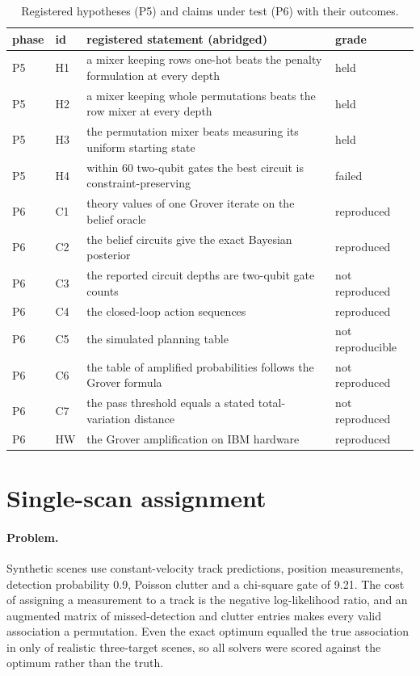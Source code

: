 \documentclass[11pt,a4paper]{article}
\begin{document}
\begin{table}[h]
\centering\small
\begin{tabular}{llp{7cm}l}
\toprule
phase & id & registered statement (abridged) & grade \\
\midrule
P5 & H1 & a mixer keeping rows one-hot beats the penalty formulation at every depth & held \\
P5 & H2 & a mixer keeping whole permutations beats the row mixer at every depth & held \\
P5 & H3 & the permutation mixer beats measuring its uniform starting state & held \\
P5 & H4 & within 60 two-qubit gates the best circuit is constraint-preserving & failed \\
\midrule
P6 & C1 & theory values of one Grover iterate on the belief oracle & reproduced \\
P6 & C2 & the belief circuits give the exact Bayesian posterior & reproduced \\
P6 & C3 & the reported circuit depths are two-qubit gate counts & not reproduced \\
P6 & C4 & the closed-loop action sequences & reproduced \\
P6 & C5 & the simulated planning table & not reproducible \\
P6 & C6 & the table of amplified probabilities follows the Grover formula & not reproduced \\
P6 & C7 & the pass threshold equals a stated total-variation distance & not reproduced \\
P6 & HW & the Grover amplification on IBM hardware & reproduced \\
\bottomrule
\end{tabular}
\caption{Registered hypotheses (P5) and claims under test (P6) with their outcomes.}\label{tab:hypothesestwo}
\end{table}

\section{Single-scan assignment}\label{sec:p1}

\paragraph{Problem.} Synthetic scenes use constant-velocity track predictions, position measurements, detection probability 0.9,
Poisson clutter and a chi-square gate of 9.21. The cost of assigning a measurement to a track is the negative log-likelihood ratio,
and an augmented matrix of missed-detection and clutter entries makes every valid association a permutation. Even the exact optimum
equalled the true association in only \PoneOptimumTruth{} of realistic three-target scenes, so all solvers were scored against the
optimum rather than the truth.
\end{document}
